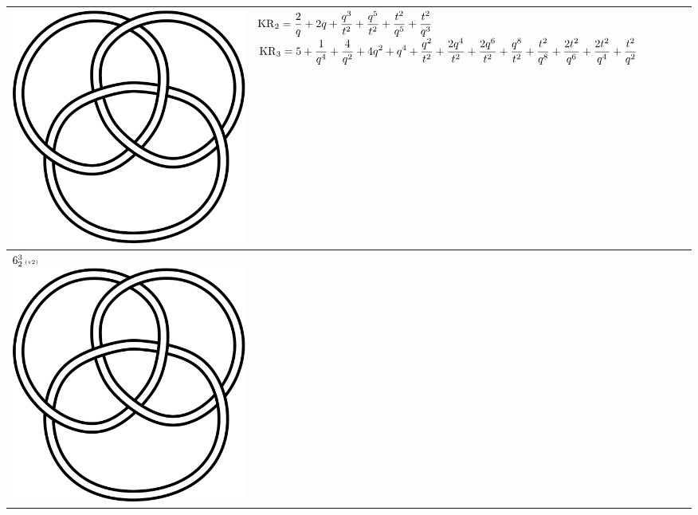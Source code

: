 \documentclass{compositio}
\theoremstyle{definition}
\numberwithin{equation}{section}
\begin{document}
{\begin{longtable}{p{}|p{}}
\includegraphics[scale=0.07,angle=0]{link6_2_3.pdf} 
& 
$
\displaystyle{%
\KR_{2} = \frac{2}{q}+2 q+\frac{q^3}{t^2}+\frac{q^5}{t^2}+\frac{t^2}{q^5}+\frac{t^2}{q^3}
}
$
\newline 
$
\displaystyle{%
\KR_{3} = 5+\frac{1}{q^4}+\frac{4}{q^2}+4 q^2+q^4+\frac{q^2}{t^2}+\frac{2 q^4}{t^2}+\frac{2 q^6}{t^2}+\frac{q^8}{t^2}+\frac{t^2}{q^8}+\frac{2 t^2}{q^6}+\frac{2 t^2}{q^4}+\frac{t^2}{q^2}
}
$
\\
\hline
$6_{2}^3\,\text{{\tiny (v2)}}$ 
\includegraphics[scale=0.07,angle=0]{link6_2_3.pdf} 

\end{longtable}}
\end{document}
